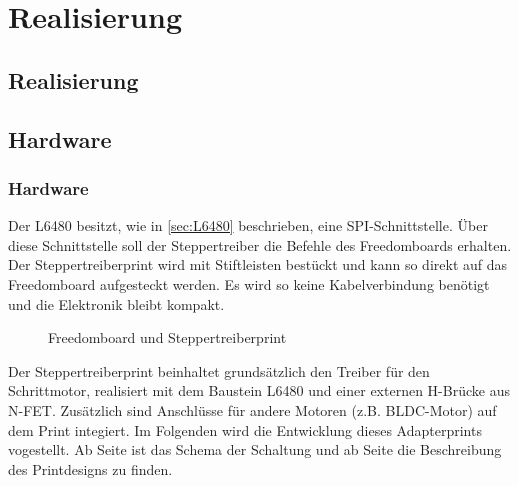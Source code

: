 \ifSTANDALONE
\section{Realisierung}
\fi
\ifEMBED
\subsection{Realisierung}
\fi 
    \ifSTANDALONE
    \subsection{Hardware} \label{ch:Hardware}
    \fi
    \ifEMBED
    \subsubsection{Hardware} \label{ch:Hardware}
    \fi
    Der L6480 besitzt, wie in \autoref{sec:L6480} beschrieben, eine 
    SPI-Schnittstelle. Über diese Schnittstelle soll der Steppertreiber die 
    Befehle des Freedomboards erhalten. Der Steppertreiberprint wird mit 
    Stiftleisten bestückt und kann so direkt auf das Freedomboard aufgesteckt 
    werden. Es wird so keine Kabelverbindung benötigt und die Elektronik 
    bleibt kompakt.
    \begin{figure}[h]
        \centering
        \caption{Freedomboard und Steppertreiberprint}
        \label{fig:Steppertreiber}
    \end{figure}
    \newline
    Der Steppertreiberprint beinhaltet grundsätzlich den Treiber für den 
    Schrittmotor, realisiert mit dem Baustein L6480 und einer externen 
    H-Brücke aus N-FET. Zusätzlich sind Anschlüsse für andere Motoren (z.B.  
    BLDC-Motor) auf dem Print integiert. Im Folgenden wird die Entwicklung 
    dieses Adapterprints vogestellt. Ab Seite \pageref{sec:Schema} ist das 
    Schema der Schaltung und ab Seite \pageref{sec:PrintDesign} die 
    Beschreibung des Printdesigns zu finden. 
    \ifSTANDALONE
